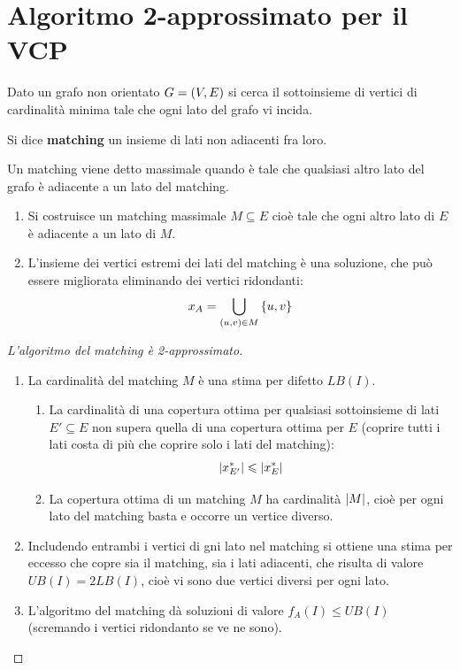 \documentclass[\main/main.tex]{subfiles}
\begin{document}
\section{Algoritmo 2-approssimato per il VCP}
\begin{multicols}{2}
\begin{definition}
    Dato un grafo non orientato \(G = \left(V, E\right)\) si cerca il sottoinsieme di vertici di cardinalità minima tale che ogni lato del grafo vi incida.
\end{definition}
\begin{definition}[Matching]
Si dice \textbf{matching} un insieme di lati non adiacenti fra loro.
\end{definition}
\begin{definition}
Un matching viene detto massimale quando è tale che qualsiasi altro lato del grafo è adiacente a un lato del matching.
\end{definition}
\begin{definition}
    \begin{enumerate}
        \item Si costruisce un matching massimale \(M \subseteq E\) cioè tale che ogni altro lato di \(E\) è adiacente a un lato di \(M\).
        \item L'insieme dei vertici estremi dei lati del matching è una soluzione, che può essere migliorata eliminando dei vertici ridondanti:
        \[
            x_A = \bigcup_{\left(u,v\right) \in M} \left\{u,v\right\}
        \]
    \end{enumerate}
\end{definition}
\begin{proof}[L'algoritmo del matching è 2-approssimato]
    \begin{enumerate}
        \item La cardinalità del matching \(M\) è una stima per difetto \(LB(I)\).
        \begin{enumerate}
            \item La cardinalità di una copertura ottima per qualsiasi sottoinsieme di lati \(E' \subseteq E\) non supera quella di una copertura ottima per \(E\) (coprire tutti i lati costa di più che coprire solo i lati del matching):
            \[
                \left\lvert x^*_{E'}\right\rvert \leqslant \left\lvert x^*_E\right\rvert
            \]
            \item La copertura ottima di un matching \(M\) ha cardinalità \(\left\lvert M\right\rvert\), cioè per ogni lato del matching basta e occorre un vertice diverso.
        \end{enumerate}
        \item Includendo entrambi i vertici di gni lato nel matching si ottiene una stima per eccesso che copre sia il matching, sia i lati adiacenti, che risulta di valore \(UB(I) = 2LB(I)\), cioè vi sono due vertici diversi per ogni lato.
        \item L'algoritmo del matching dà soluzioni di valore \(f_A(I) \leq UB(I)\) (scremando i vertici ridondanto se ve ne sono).
    \end{enumerate}
    

\end{proof}
\end{multicols}
\end{document}
